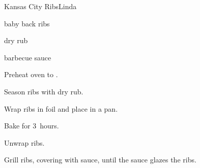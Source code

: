 \begin{recipe}{Kansas City Ribs}{Linda}{}

\begin{ingredients}
\item baby back  ribs
\item dry rub
\item barbecue sauce
\end{ingredients}

\begin{directions}
\item Preheat oven to .
\item Season ribs with dry rub.
\item Wrap ribs in foil and place in a pan.
\item Bake for 3~hours.
\item Unwrap ribs.
\item Grill ribs, covering with sauce, until the sauce glazes the ribs.
\end{directions}

\end{recipe}
